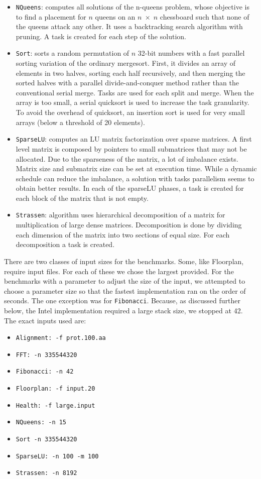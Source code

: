 \documentclass[sigconf]{acmart}
\begin{document}
\begin{itemize}
\item \texttt{NQueens}: computes  all  solutions  of  the n-queens
problem, whose objective is to find a placement for $n$ queens on an $n \;
\times \; n$ chessboard such that none of the queens attack any other. It uses
a backtracking search algorithm with pruning. A task is created for each step
of the solution.
\item \texttt{Sort}: sorts a random permutation of $n$ 32-bit numbers with  a
fast  parallel  sorting  variation of  the  ordinary mergesort.  First, it
divides an array of elements in two halves, sorting  each half  recursively,
and  then  merging  the  sorted halves with a parallel divide-and-conquer
method rather than the  conventional  serial  merge.  Tasks are  used  for
each  split and merge. When the array is too small, a serial quicksort is used
to increase  the  task  granularity.  To  avoid  the overhead of  quicksort, an
insertion  sort  is  used  for  very  small  arrays (below a threshold of 20
elements).
\item \texttt{SparseLU}: computes an LU matrix factorization over
sparse matrices. A first level matrix is composed by pointers to  small
submatrices  that  may  not  be  allocated.  Due  to  the sparseness  of  the
matrix,  a  lot  of  imbalance  exists.  Matrix size and submatrix size can be
set at execution time. While a dynamic schedule can reduce the imbalance, a
solution with tasks parallelism seems to obtain better results. In each
of the sparseLU  phases,  a  task  is  created  for  each  block  of  the
matrix that is not empty.
\item \texttt{Strassen}: algorithm  uses  hierarchical  decomposition of a
matrix for multiplication of large dense matrices. Decomposition is done by
dividing each dimension of the matrix into  two  sections  of  equal size. For
each decomposition a task is created.
\end{itemize}

There are two classes of input sizes for the benchmarks. Some, like Floorplan,
require input files. For each of these we chose the largest provided. For the
benchmarks with a parameter to adjust the size of the input, we attempted to
choose a parameter size so that the fastest implementation ran on the order of
seconds. The one exception was for \texttt{Fibonacci}. Because, as discussed
further below, the Intel implementation required a large stack size, we stopped at
42. The exact inputs used are:

\begin{itemize}
\item \texttt{Alignment: -f prot.100.aa}
\item \texttt{FFT: -n 335544320}
\item \texttt{Fibonacci: -n 42}
\item \texttt{Floorplan: -f input.20}
\item \texttt{Health: -f large.input}
\item \texttt{NQueens: -n 15}
\item \texttt{Sort -n 335544320}
\item \texttt{SparseLU: -n 100 -m 100}
\item \texttt{Strassen: -n 8192}
\end{itemize}
\end{document}
